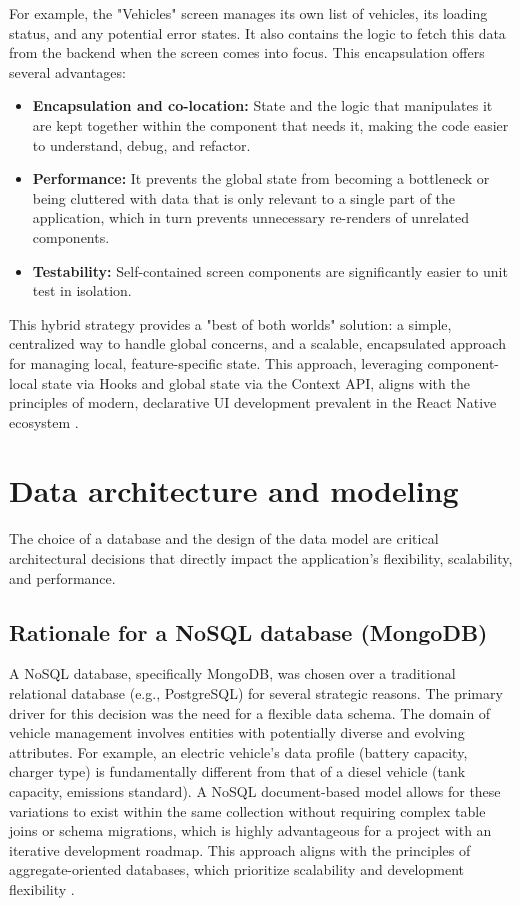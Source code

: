 \textgap

For example, the "Vehicles" screen manages its own list of vehicles, its loading status, and any potential error states. It also contains the logic to fetch this data from the backend when the screen comes into focus. This encapsulation offers several advantages:
\begin{itemize}
    \item \textbf{Encapsulation and co-location:} State and the logic that manipulates it are kept together within the component that needs it, making the code easier to understand, debug, and refactor.
    \item \textbf{Performance:} It prevents the global state from becoming a bottleneck or being cluttered with data that is only relevant to a single part of the application, which in turn prevents unnecessary re-renders of unrelated components.
    \item \textbf{Testability:} Self-contained screen components are significantly easier to unit test in isolation.
\end{itemize}
This hybrid strategy provides a "best of both worlds" solution: a simple, centralized way to handle global concerns, and a scalable, encapsulated approach for managing local, feature-specific state. This approach, leveraging component-local state via Hooks and global state via the Context API, aligns with the principles of modern, declarative UI development prevalent in the React Native ecosystem \cite{Djirdeh2018FullstackReactNative}.

\section{Data architecture and modeling}

The choice of a database and the design of the data model are critical architectural decisions that directly impact the application's flexibility, scalability, and performance.

\subsection{Rationale for a NoSQL database (MongoDB)}
A NoSQL database, specifically MongoDB, was chosen over a traditional relational database (e.g., PostgreSQL) for several strategic reasons. The primary driver for this decision was the need for a flexible data schema. The domain of vehicle management involves entities with potentially diverse and evolving attributes. For example, an electric vehicle's data profile (battery capacity, charger type) is fundamentally different from that of a diesel vehicle (tank capacity, emissions standard). A NoSQL document-based model allows for these variations to exist within the same collection without requiring complex table joins or schema migrations, which is highly advantageous for a project with an iterative development roadmap. This approach aligns with the principles of aggregate-oriented databases, which prioritize scalability and development flexibility \cite{Sadalage2012NoSQLDistilled}.

